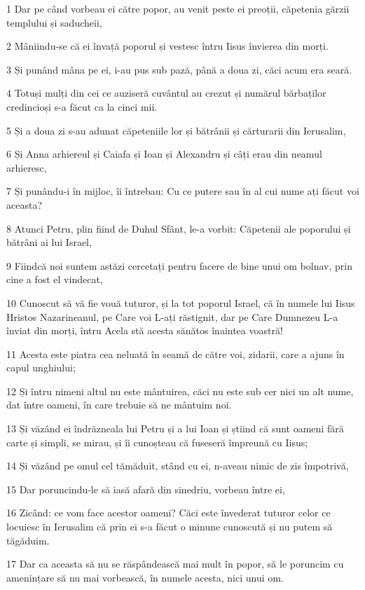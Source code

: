 \par 1 Dar pe când vorbeau ei către popor, au venit peste ei preoții, căpetenia gărzii templului și saducheii,
\par 2 Mâniindu-se că ei învață poporul și vestesc întru Iisus învierea din morți.
\par 3 Și punând mâna pe ei, i-au pus sub pază, până a doua zi, căci acum era seară.
\par 4 Totuși mulți din cei ce auziseră cuvântul au crezut și numărul bărbaților credincioși s-a făcut ca la cinci mii.
\par 5 Și a doua zi s-au adunat căpeteniile lor și bătrânii și cărturarii din Ierusalim,
\par 6 Și Anna arhiereul și Caiafa și Ioan și Alexandru și câți erau din neamul arhieresc,
\par 7 Și punându-i în mijloc, îi întrebau: Cu ce putere sau în al cui nume ați făcut voi aceasta?
\par 8 Atunci Petru, plin fiind de Duhul Sfânt, le-a vorbit: Căpetenii ale poporului și bătrâni ai lui Israel,
\par 9 Fiindcă noi suntem astăzi cercetați pentru facere de bine unui om bolnav, prin cine a fost el vindecat,
\par 10 Cunoscut să vă fie vouă tuturor, și la tot poporul Israel, că în numele lui Iisus Hristos Nazarineanul, pe Care voi L-ați răstignit, dar pe Care Dumnezeu L-a înviat din morți, întru Acela stă acesta sănătos înaintea voastră!
\par 11 Acesta este piatra cea neluată în seamă de către voi, zidarii, care a ajuns în capul unghiului;
\par 12 Și întru nimeni altul nu este mântuirea, căci nu este sub cer nici un alt nume, dat între oameni, în care trebuie să ne mântuim noi.
\par 13 Și văzând ei îndrăzneala lui Petru și a lui Ioan și știind că sunt oameni fără carte și simpli, se mirau, și îi cunoșteau că fuseseră împreună cu Iisus;
\par 14 Și văzând pe omul cel tămăduit, stând cu ei, n-aveau nimic de zis împotrivă,
\par 15 Dar poruncindu-le să iasă afară din sinedriu, vorbeau între ei,
\par 16 Zicând: ce vom face acestor oameni? Căci este învederat tuturor celor ce locuiesc în Ierusalim că prin ei s-a făcut o minune cunoscută și nu putem să tăgăduim.
\par 17 Dar ca aceasta să nu se răspândească mai mult în popor, să le poruncim cu amenințare să nu mai vorbească, în numele acesta, nici unui om.

